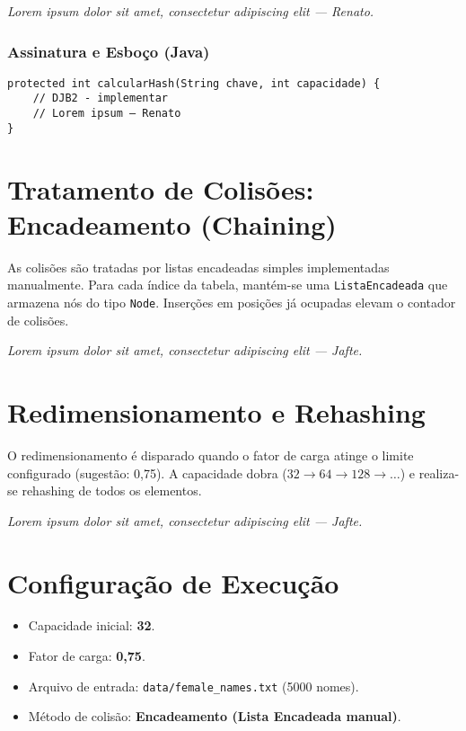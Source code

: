 \documentclass[12pt,a4paper]{abntex2}
\newcommand{\placeholderAluno}[1]{\textit{Lorem ipsum dolor sit amet, consectetur adipiscing elit — #1.}}
\begin{document}
\placeholderAluno{Renato}

\subsubsection*{Assinatura e Esboço (Java)}
\begin{lstlisting}[style=console]
protected int calcularHash(String chave, int capacidade) {
    // DJB2 - implementar
    // Lorem ipsum — Renato
}
\end{lstlisting}

\section{Tratamento de Colisões: Encadeamento (Chaining)}
As colisões são tratadas por listas encadeadas simples implementadas manualmente. Para cada índice da tabela, mantém-se uma \texttt{ListaEncadeada} que armazena nós do tipo \texttt{Node}. Inserções em posições já ocupadas elevam o contador de colisões.

\placeholderAluno{Jafte}

\section{Redimensionamento e Rehashing}
O redimensionamento é disparado quando o fator de carga atinge o limite configurado (sugestão: 0{,}75). A capacidade dobra (\(32 \rightarrow 64 \rightarrow 128 \rightarrow \ldots\)) e realiza-se rehashing de todos os elementos.

\placeholderAluno{Jafte}

\section{Configuração de Execução}
\begin{itemize}
  \item Capacidade inicial: \textbf{32}.
  \item Fator de carga: \textbf{0,75}.
  \item Arquivo de entrada: \texttt{data/female\_names.txt} (5000 nomes).
  \item Método de colisão: \textbf{Encadeamento (Lista Encadeada manual)}.
\end{itemize}
\end{document}
